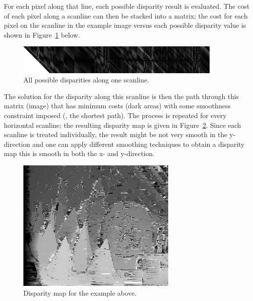 For each pixel along that line, each possible disparity result is evaluated. The
cost of each pixel along a scanline can then be stacked into a matrix; the cost
for each pixel on the scanline in the example image versus each possible
disparity value is shown in Figure~\ref{fig:scanline} below.

\begin{figure}[htpb]
  \centering \includegraphics[width=0.9\textwidth]{Figures/scanline_costs}
  \caption{All possible disparities along one scanline.}%
  \label{fig:scanline}
\end{figure}

The solution for the disparity along this scanline is then the path through this
matrix (image) that has minimum costs (dark areas) with some smoothness
constraint imposed (\ie, the shortest path). The process is repeated for every
horizontal scanline; the resulting disparity map is given in
Figure~\ref{fig:disperity_map}. Since each scanline is treated individually, the
result might be not very smooth in the y-direction and one can apply different
smoothing techniques to obtain a disparity map this is smooth in both the x- and
y-direction.

\begin{figure}[htpb]
  \centering
  \includegraphics[width=0.7\textwidth]{Figures/cones_scanline_optimization_only}%
  \caption{Disparity map for the example above.}%
  \label{fig:disperity_map}
\end{figure}

